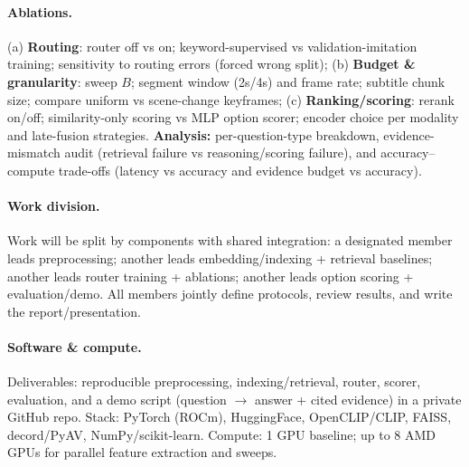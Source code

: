 \documentclass{article}
\begin{document}
\vspace{-2pt}
\paragraph{Ablations.}
(a) \textbf{Routing}: router off vs on; keyword-supervised vs validation-imitation training; sensitivity to routing errors (forced wrong split);
(b) \textbf{Budget \& granularity}: sweep $B$; segment window (2s/4s) and frame rate; subtitle chunk size; compare uniform vs scene-change keyframes;
(c) \textbf{Ranking/scoring}: rerank on/off; similarity-only scoring vs MLP option scorer; encoder choice per modality and late-fusion strategies.
\textbf{Analysis:} per-question-type breakdown, evidence-mismatch audit (retrieval failure vs reasoning/scoring failure), and accuracy--compute trade-offs (latency vs accuracy and evidence budget vs accuracy).


\vspace{-2pt}
\paragraph{Work division.}
Work will be split by components with shared integration: a designated member leads preprocessing; another leads embedding/indexing + retrieval baselines; another leads router training + ablations; another leads option scoring + evaluation/demo. All members jointly define protocols, review results, and write the report/presentation.

\vspace{-2pt}
\paragraph{Software \& compute.}
Deliverables: reproducible preprocessing, indexing/retrieval, router, scorer, evaluation, and a demo script (question $\rightarrow$ answer + cited evidence) in a private GitHub repo.
Stack: PyTorch (ROCm), HuggingFace, OpenCLIP/CLIP, FAISS, decord/PyAV, NumPy/scikit-learn.
Compute: 1 GPU baseline; up to 8 AMD GPUs for parallel feature extraction and sweeps.

\vspace{-2pt}
\end{document}
